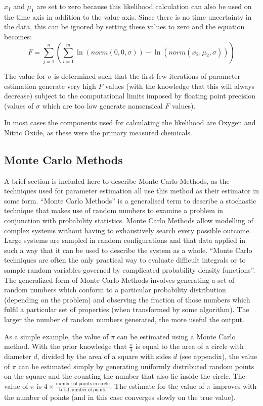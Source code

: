 $x_1$ and $\mu_1$ are set to zero because this likelihood calculation can also be used on the time axis in addition to the value axis. Since there is no time uncertainty in the data, this can be ignored by setting these values to zero and the equation becomes:
\begin{equation}
F = \sum^{n}_{j=1}\left(\sum^{m}_{i=1}\ln(norm(0,0,\sigma)) - \ln(norm(x_2,\mu_2,\sigma))\right)
\label{log-likelihood}
\end{equation}

The value for $\sigma$ is determined such that the first few iterations of parameter estimation generate very high $F$ values (with the knowledge that this will always decrease) subject to the computational limits imposed by floating point precision (values of $\sigma$ which are too low generate nonsensical $F$ values).

In most cases the components used for calculating the likelihood are Oxygen and Nitric Oxide, as these were the primary measured chemicals.
\subsection{Monte Carlo Methods}
A brief section is included here to describe Monte Carlo Methods, as the techniques used for parameter estimation all use this method as their estimator in some form.
``Monte Carlo Methods'' is a generalised term to describe a stochastic technique that makes use of random numbers to examine a problem in conjunction with probability statistics. Monte Carlo Methods allow modelling of complex systems without having to exhaustively search every possible outcome. Large systems are sampled in random configurations and that data applied in such a way that it can be used to describe the system as a whole. ``Monte Carlo techniques are often the only practical way to evaluate difficult integrals or to sample random variables governed by complicated probability density functions''\cite{Nakamura2010}. The generalized form of Monte Carlo Methods involves generating a set of random numbers which conform to a particular probability distribution (depending on the problem) and observing the fraction of those numbers which fulfil a particular set of properties (when transformed by some algorithm). The larger the number of random numbers generated, the more useful the output.

As a simple example, the value of $\pi$ can be estimated using a Monte Carlo method. With the prior knowledge that $\frac{\pi}{4}$ is equal to the area of a circle with diameter $d$, divided by the area of a square with sides $d$ (see appendix), the value of $\pi$ can be estimated simply by generating uniformly distributed random points on the square and the counting the number that also lie inside the circle. The value of $\pi$ is $4\times\frac{\mathrm{number~of~points~in~circle}}{\mathrm{total~number~of~points}}$. The estimate for the value of $\pi$ improves with the number of points (and in this case converges slowly on the true value).

